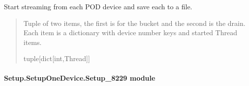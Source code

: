 \documentclass[letterpaper,10pt,english]{sphinxmanual}
\begin{document}
\begin{fulllineitems}
\begin{fulllineitems}
\end{fulllineitems}


\begin{fulllineitems}
\label{\detokenize{Setup.SetupOneDevice:Setup.SetupOneDevice.Setup_8206HR.Setup8206HR._StreamThreading}}
\pysigstartsignatures
{}
\pysigstopsignatures
\sphinxAtStartPar
Start streaming from each POD device and save each to a file.
\begin{quote}\begin{description}
\sphinxAtStartPar
Tuple of two items, the first is for the bucket and the second is the drain.                 Each item is a dictionary with device number keys and started Thread items.

\sphinxAtStartPar
tuple{[}dict{[}int,Thread{]}{]}

\end{description}\end{quote}

\end{fulllineitems}


\end{fulllineitems}



\paragraph{Setup.SetupOneDevice.Setup\_8229 module}
\label{\detokenize{Setup.SetupOneDevice:module-Setup.SetupOneDevice.Setup_8229}}\label{\detokenize{Setup.SetupOneDevice:setup-setuponedevice-setup-8229-module}}
\end{document}
